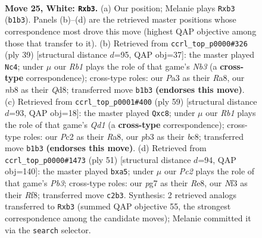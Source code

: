 \documentclass[11pt]{article}
\begin{document}
\begin{figure}[p]
\label{fig:thought-m46}
\end{figure}

\clearpage

\begin{figure}[p]\centering
\begin{subfigure}{0.46\textwidth}\centering
\resizebox{\linewidth}{!}{%
\newchessgame
\chessboard[
  setfen={rn2r1k1/2pnq1pp/1p2p3/p3Pp2/3P1P1P/Pp3NNQ/2PK2P1/1R5R w - - 0 25},
  showmover=false,
  pgfstyle=straightmove, color=movearrow, markmove={b1-b3}
]}
\caption{}
\end{subfigure}\hfill
\begin{subfigure}{0.46\textwidth}\centering
\resizebox{\linewidth}{!}{%
\newchessgame
\chessboard[
  setfen={r2q1r2/1p1n1ppk/1n2p2p/p2pP3/P2P1PQ1/8/1P1N2PP/R3NR1K b - - 0 20},
  showmover=false,
  pgfstyle=straightmove, color=movearrow, markmove={b6-c4}
]}
\caption{}
\end{subfigure}
\\[4pt]
\begin{subfigure}{0.46\textwidth}\centering
\resizebox{\linewidth}{!}{%
\newchessgame
\chessboard[
  setfen={r1Bqr1k1/6p1/2pb1n1p/pp1p1Q2/7P/1PNN2P1/P1R1PP2/3R2K1 b - - 2 30},
  showmover=false,
  pgfstyle=straightmove, color=movearrow, markmove={d8-c8}
]}
\caption{}
\end{subfigure}\hfill
\begin{subfigure}{0.46\textwidth}\centering
\resizebox{\linewidth}{!}{%
\newchessgame
\chessboard[
  setfen={4rr1k/p6p/1pn1n1q1/P1pNpp2/1PP5/5PP1/3QN2P/3R1R1K b - - 0 26},
  showmover=false,
  pgfstyle=straightmove, color=movearrow, markmove={b6-a5}
]}
\caption{}
\end{subfigure}
\caption{\textbf{Move 25, White: \texttt{Rxb3}.} (a) Our position; Melanie plays \texttt{Rxb3} (\texttt{b1b3}). Panels (b)--(d) are the retrieved master positions whose correspondence most drove this move (highest QAP objective among those that transfer to it). (b) Retrieved from \texttt{ccrl\_top\_p0000\#326} (ply 39) [structural distance $d$=95, QAP obj=37]: the master played \texttt{Nc4}; under $\mu$ our \emph{Rb1} plays the role of that game's \emph{Nb3} (a \textbf{cross-type} correspondence); cross-type roles: our \emph{P}a3 as their \emph{R}a8, our \emph{n}b8 as their \emph{Q}d8; transferred move \texttt{b1b3} \textbf{(endorses this move)}. (c) Retrieved from \texttt{ccrl\_top\_p0001\#400} (ply 59) [structural distance $d$=93, QAP obj=18]: the master played \texttt{Qxc8}; under $\mu$ our \emph{Rb1} plays the role of that game's \emph{Qd1} (a \textbf{cross-type} correspondence); cross-type roles: our \emph{P}c2 as their \emph{R}a8, our \emph{p}b3 as their \emph{b}c8; transferred move \texttt{b1b3} \textbf{(endorses this move)}. (d) Retrieved from \texttt{ccrl\_top\_p0000\#1473} (ply 51) [structural distance $d$=94, QAP obj=140]: the master played \texttt{bxa5}; under $\mu$ our \emph{Pc2} plays the role of that game's \emph{Pb3}; cross-type roles: our \emph{p}g7 as their \emph{R}e8, our \emph{N}f3 as their \emph{R}f8; transferred move \texttt{c2b3}. Synthesis: 2 retrieved analogs transferred to \texttt{Rxb3} (summed QAP objective 55, the strongest correspondence among the candidate moves); Melanie committed it via the \texttt{search} selector.}

\end{figure}
\end{document}
